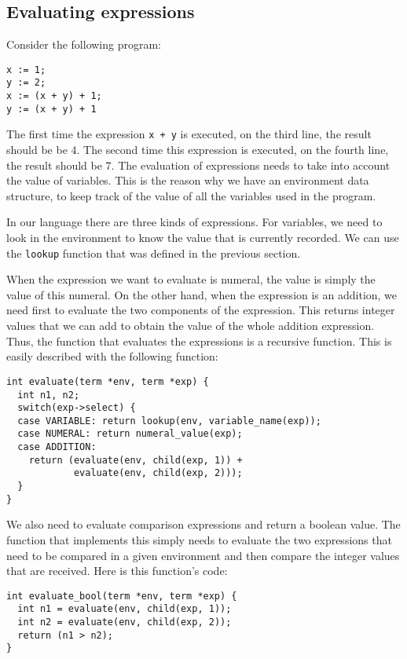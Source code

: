 \documentclass{book}
\begin{document}
\subsection{Evaluating expressions}
Consider the following program:
\begin{verbatim}
x := 1;
y := 2;
x := (x + y) + 1;
y := (x + y) + 1
\end{verbatim}
The first time the expression {\tt x + y} is executed, on the third line,
the result should be be 4.  The second time this expression is executed,
on the fourth line, the result should be 7.  The evaluation of expressions
needs to take into account the value of variables.  This is the reason
why we  have an environment data structure, to keep track of the
value of all the variables used in the program.

In our language there are three kinds of expressions.  For variables,
we need to look in the environment to know the value that is currently
recorded.  We can use the {\tt lookup} function that was defined in the
previous section.

When the expression we want to evaluate is numeral, the value is
simply the value of this numeral.  On the other hand, when the
expression is an addition, we need first to evaluate the two
components of the expression.  This returns integer values that we can
add to obtain the value of the whole addition expression.  Thus, the
function that evaluates the expressions is a recursive function.
This is easily described with the following function:
\begin{verbatim}
int evaluate(term *env, term *exp) {
  int n1, n2;
  switch(exp->select) {
  case VARIABLE: return lookup(env, variable_name(exp));
  case NUMERAL: return numeral_value(exp);
  case ADDITION:
    return (evaluate(env, child(exp, 1)) +
            evaluate(env, child(exp, 2)));
  }
}
\end{verbatim}
We also need to evaluate comparison expressions and return a boolean value.
The function that implements this simply needs to evaluate the two
expressions that need to be compared in a given environment and then
compare the integer values that are received.  Here is this function's
code:
\begin{verbatim}
int evaluate_bool(term *env, term *exp) {
  int n1 = evaluate(env, child(exp, 1));
  int n2 = evaluate(env, child(exp, 2));
  return (n1 > n2);
}
\end{verbatim}
\end{document}
